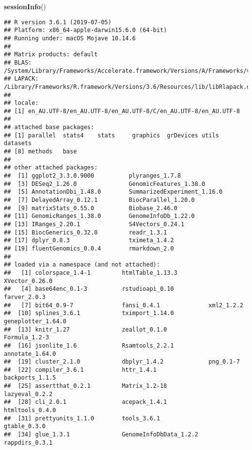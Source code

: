 \documentclass[
]{article}
\newenvironment{Shaded}{}{}
\newcommand{\KeywordTok}[1]{\textcolor[rgb]{0.00,0.44,0.13}{\textbf{#1}}}
\newcommand{\NormalTok}[1]{#1}
\begin{document}
\begin{Shaded}
\begin{Highlighting}[]
\KeywordTok{sessionInfo}\NormalTok{()}
\end{Highlighting}
\end{Shaded}

\begin{verbatim}
## R version 3.6.1 (2019-07-05)
## Platform: x86_64-apple-darwin15.6.0 (64-bit)
## Running under: macOS Mojave 10.14.6
## 
## Matrix products: default
## BLAS:   /System/Library/Frameworks/Accelerate.framework/Versions/A/Frameworks/vecLib.framework/Versions/A/libBLAS.dylib
## LAPACK: /Library/Frameworks/R.framework/Versions/3.6/Resources/lib/libRlapack.dylib
## 
## locale:
## [1] en_AU.UTF-8/en_AU.UTF-8/en_AU.UTF-8/C/en_AU.UTF-8/en_AU.UTF-8
## 
## attached base packages:
## [1] parallel  stats4    stats     graphics  grDevices utils     datasets 
## [8] methods   base     
## 
## other attached packages:
##  [1] ggplot2_3.3.0.9000          plyranges_1.7.8            
##  [3] DESeq2_1.26.0               GenomicFeatures_1.38.0     
##  [5] AnnotationDbi_1.48.0        SummarizedExperiment_1.16.0
##  [7] DelayedArray_0.12.1         BiocParallel_1.20.0        
##  [9] matrixStats_0.55.0          Biobase_2.46.0             
## [11] GenomicRanges_1.38.0        GenomeInfoDb_1.22.0        
## [13] IRanges_2.20.1              S4Vectors_0.24.1           
## [15] BiocGenerics_0.32.0         readr_1.3.1                
## [17] dplyr_0.8.3                 tximeta_1.4.2              
## [19] fluentGenomics_0.0.4        rmarkdown_2.0              
## 
## loaded via a namespace (and not attached):
##   [1] colorspace_1.4-1         htmlTable_1.13.3         XVector_0.26.0          
##   [4] base64enc_0.1-3          rstudioapi_0.10          farver_2.0.3            
##   [7] bit64_0.9-7              fansi_0.4.1              xml2_1.2.2              
##  [10] splines_3.6.1            tximport_1.14.0          geneplotter_1.64.0      
##  [13] knitr_1.27               zeallot_0.1.0            Formula_1.2-3           
##  [16] jsonlite_1.6             Rsamtools_2.2.1          annotate_1.64.0         
##  [19] cluster_2.1.0            dbplyr_1.4.2             png_0.1-7               
##  [22] compiler_3.6.1           httr_1.4.1               backports_1.1.5         
##  [25] assertthat_0.2.1         Matrix_1.2-18            lazyeval_0.2.2          
##  [28] cli_2.0.1                acepack_1.4.1            htmltools_0.4.0         
##  [31] prettyunits_1.1.0        tools_3.6.1              gtable_0.3.0            
##  [34] glue_1.3.1               GenomeInfoDbData_1.2.2   rappdirs_0.3.1          

\end{verbatim}
\end{document}
